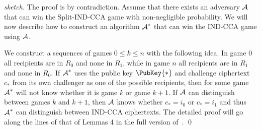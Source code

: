 \begin{proof}[sketch]
  The proof is by contradiction.
  Assume that there exists an adversary \(\A\) that can win the Split-IND-CCA 
  game with non-negligible probability.
  We will now describe how to construct an algorithm \(\A*\) that can win the 
  IND-CCA game using \(\A\).

  We construct a sequences of games \(0\leq k\leq n\) with the following idea.
  In game \(0\) all recipients are in \(R_0\) and none in \(R_1\), while in 
  game \(n\) all recipients are in \(R_1\) and none in \(R_0\).
  If \(\A*\) uses the public key \(\PubKey{*}\) and challenge ciphertext 
  \(c_*\) from its own challenger as one of the possible recipients, then for 
  some game \(\A*\) will not know whether it is game \(k\) or game \(k+1\).
  If \(\A\) can distinguish between games \(k\) and \(k+1\), then \(\A\) knows 
  whether \(c_* = i_0\) or \(c_* = i_1\) and thus \(\A*\) can distinguish 
  between IND-CCA ciphertexts.
%
%
%
%
  The detailed proof will go along the lines of that of Lemmas 4 in the full 
  version of~\cite{ANOBE}.
  \qed{}
\end{proof}

